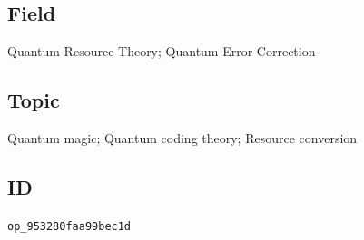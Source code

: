 \subsection*{Field}

Quantum Resource Theory; Quantum Error Correction

\subsection*{Topic}

Quantum magic; Quantum coding theory; Resource conversion

\subsection*{ID}

\texttt{op\_953280faa99bec1d}
